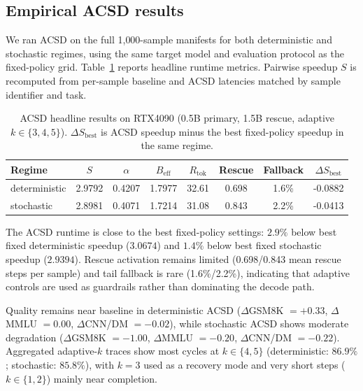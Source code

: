 \subsection{Empirical ACSD results}

We ran ACSD on the full 1{,}000-sample manifests for both deterministic and
stochastic regimes, using the same target model and evaluation protocol as the
fixed-policy grid. Table~\ref{tab:acsd-headline} reports headline runtime
metrics. Pairwise speedup $S$ is recomputed from per-sample baseline and ACSD
latencies matched by sample identifier and task.

\begin{table}[t]
\centering
\caption{ACSD headline results on RTX4090 (0.5B primary, 1.5B rescue,
adaptive $k\in\{3,4,5\}$). $\Delta S_{\text{best}}$ is ACSD speedup minus the
best fixed-policy speedup in the same regime.}
\label{tab:acsd-headline}
\small
\begin{tabular}{l c c c c c c c}
\hline
\textbf{Regime} & $S$ & $\alpha$ & $B_{\text{eff}}$ & $R_{\text{tok}}$ & Rescue & Fallback & $\Delta S_{\text{best}}$ \\
\hline
deterministic & 2.9792 & 0.4207 & 1.7977 & 32.61 & 0.698 & 1.6\% & -0.0882 \\
stochastic    & 2.8981 & 0.4071 & 1.7214 & 31.08 & 0.843 & 2.2\% & -0.0413 \\
\hline
\end{tabular}
\end{table}

The ACSD runtime is close to the best fixed-policy settings: $2.9\%$ below
best fixed deterministic speedup ($3.0674$) and $1.4\%$ below best fixed
stochastic speedup ($2.9394$). Rescue activation remains limited
(0.698/0.843 mean rescue steps per sample) and tail fallback is rare
(1.6\%/2.2\%), indicating that adaptive controls are used as guardrails rather
than dominating the decode path.

Quality remains near baseline in deterministic ACSD
($\Delta$GSM8K $=+0.33$, $\Delta$MMLU $=0.00$, $\Delta$CNN/DM $=-0.02$), while
stochastic ACSD shows moderate degradation
($\Delta$GSM8K $=-1.00$, $\Delta$MMLU $=-0.20$, $\Delta$CNN/DM $=-0.22$).
Aggregated adaptive-$k$ traces show most cycles at $k\in\{4,5\}$
(deterministic: $86.9\%$; stochastic: $85.8\%$), with $k{=}3$ used as a
recovery mode and very short steps ($k\in\{1,2\}$) mainly near completion.
